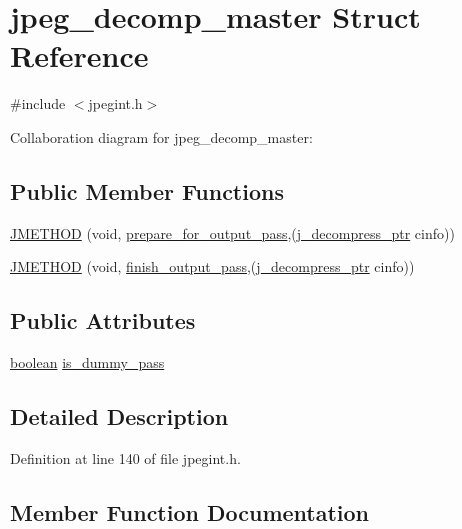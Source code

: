 \hypertarget{structjpeg__decomp__master}{}\section{jpeg\+\_\+decomp\+\_\+master Struct Reference}
\label{structjpeg__decomp__master}


{\ttfamily \#include $<$jpegint.\+h$>$}



Collaboration diagram for jpeg\+\_\+decomp\+\_\+master\+:
\subsection*{Public Member Functions}
\begin{DoxyCompactItemize}
\item 
\mbox{\hyperlink{structjpeg__decomp__master_ab0e51667ba436fad82e7cf95b1bd4120}{J\+M\+E\+T\+H\+OD}} (void, \mbox{\hyperlink{jdmaster_8c_a67420f4157afdc9fdf730941dbaf8503}{prepare\+\_\+for\+\_\+output\+\_\+pass}},(\mbox{\hyperlink{jpeglib_8h_a00c7d78af44bd26a901c791ccfc1e178}{j\+\_\+decompress\+\_\+ptr}} cinfo))
\item 
\mbox{\hyperlink{structjpeg__decomp__master_a7dec615b828e443ddddf99078d1edb9a}{J\+M\+E\+T\+H\+OD}} (void, \mbox{\hyperlink{jdmaster_8c_a38d4530fe1a7a3442c983735c656dfd0}{finish\+\_\+output\+\_\+pass}},(\mbox{\hyperlink{jpeglib_8h_a00c7d78af44bd26a901c791ccfc1e178}{j\+\_\+decompress\+\_\+ptr}} cinfo))
\end{DoxyCompactItemize}
\subsection*{Public Attributes}
\begin{DoxyCompactItemize}
\item 
\mbox{\hyperlink{jmorecfg_8h_a7c6368b321bd9acd0149b030bb8275ed}{boolean}} \mbox{\hyperlink{structjpeg__decomp__master_a93cbde036bd87ab00b0ac8214e27bbe1}{is\+\_\+dummy\+\_\+pass}}
\end{DoxyCompactItemize}


\subsection{Detailed Description}


Definition at line 140 of file jpegint.\+h.



\subsection{Member Function Documentation}
\mbox{\label{structjpeg__decomp__master_ab0e51667ba436fad82e7cf95b1bd4120}} 
